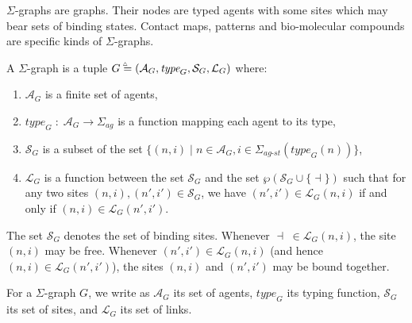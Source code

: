 \documentclass{entcs}
\newcommand{\freesymbol}{\dashv}
\newcommand{\graphsymb}{G}
\newcommand{\agentname}{\signaturesymb_{\textit{ag}}}
\newcommand{\linksite}{\signaturesymb_{\textit{ag-st}}}
\newcommand{\signaturesymb}{\Sigma}
\newcommand{\bydef}{\stackrel{\scalebox{0.8}{\!\!$\scriptscriptstyle{\triangle}$}}{=}}
\newcommand{\agents}[1][\graphsymb]{\mathcal{A}_{#1}}
\newcommand{\type}[1][\graphsymb]{\textit{type}_{#1}}
\newcommand{\sites}[1][\graphsymb]{\mathcal{S}_{#1}}
\newcommand{\links}[1][\graphsymb]{\mathcal{L}_{#1}}
\newcommand{\ext}{\{\freesymbol{}\}}
\newcommand{\graphtuple}[1][]{(\agents[#1],\type[#1],\sites[#1],\links[#1])}
\begin{document}
$\Sigma$-graphs are graphs. Their nodes are typed agents with some sites which may bear sets of binding states. Contact maps, patterns and bio-molecular compounds are specific kinds of $\Sigma$-graphs.



\begin{defn}\label{def:summary}
A $\Sigma$-graph is a tuple $\graphsymb\bydef\graphtuple[G]$ where:
\begin{enumerate}
\item $\agents[G]$ is a finite set of agents,
\item $\type[G]\;:\;\agents\rightarrow \agentname$ is a function mapping each agent to its type,
\item $\sites[G]$ is a subset of the set $\{(n,i)\;|\; n\in \agents, i\in\linksite(\type[G](n))\}$,
\item $\links[G]$ is a function between the set $\sites$ and the set
 $\wp(\sites\cup\ext)$  such that for any two sites $(n,i),(n',i')\in\sites$, we have $(n',i')\in\links[G](n,i)$ if and only if $(n,i)\in\links[G](n',i')$.
\end{enumerate}
\end{defn}

The set $\sites$ denotes the set of binding sites.
Whenever $\freesymbol\;\in\links(n,i)$, the site $(n,i)$ may be free.
Whenever $(n',i')\in\links(n,i)$ (and hence $(n,i)\in\links(n',i')$), the sites $(n,i)$ and $(n',i')$ may be bound together.

For a $\Sigma$-graph $\graphsymb$, we write as $\agents[\graphsymb]$ its set of agents, $\type[\graphsymb]$ its typing function, $\sites[\graphsymb]$ its set of sites, and $\links[\graphsymb]$ its set of links.
\end{document}
